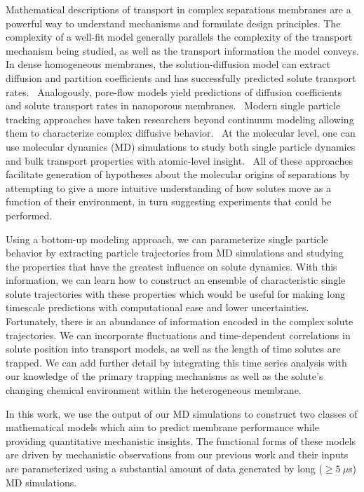 \documentclass[aps,pre,preprint,groupedaddress,longbibliography]{revtex4-2}
\begin{document}
  Mathematical descriptions of transport in complex separations membranes are a
  powerful way to understand mechanisms and formulate design principles.
  \cite{vinh-thang_predictive_2013,geens_transport_2006,darvishmanesh_mass_2016}
  The complexity of a well-fit model generally parallels the complexity of the
  transport mechanism being studied, as well as the transport information the
  model conveys. In dense homogeneous membranes, the solution-diffusion model
  can extract diffusion and partition coefficients and has successfully
  predicted solute transport rates.~\cite{wijmans_solution-diffusion_1995}
  Analogously, pore-flow models yield predictions of diffusion coefficients and
  solute transport rates in nanoporous membranes.~\cite{paul_diffusive_1974}
  Modern single particle tracking approaches have taken researchers beyond
  continuum modeling allowing them to characterize complex diffusive
  behavior.~\cite{manzo_review_2015} At the molecular level, one can use
  molecular dynamics (MD) simulations to study both single particle dynamics
  and bulk transport properties with atomic-level
  insight.~\cite{coscia_chemically_2019,maginn_best_2018} All of these
  approaches facilitate generation of hypotheses about the molecular origins of
  separations by attempting to give a more intuitive understanding of how
  solutes move as a function of their environment, in turn suggesting
  experiments that could be performed.

  Using a bottom-up modeling approach, we can parameterize single particle
  behavior by extracting particle trajectories from MD simulations and studying
  the properties that have the greatest influence on solute dynamics. With this
  information, we can learn how to construct an ensemble of characteristic
  single solute trajectories with these properties which would be useful for
  making long timescale predictions with computational ease and lower
  uncertainties. Fortunately, there is an abundance of information encoded in
  the complex solute trajectories. We can incorporate fluctuations and 
  time-dependent correlations in solute position into transport models, 
  as well as the length of time solutes are trapped. We can add further detail by integrating
  this time series analysis with our knowledge of the primary trapping
  mechanisms as well as the solute's changing chemical environment within the
  heterogeneous membrane. 

  In this work, we use the output of our MD simulations to construct two
  classes of mathematical models which aim to predict membrane performance
  while providing quantitative mechanistic insights. The functional forms of
  these models are driven by mechanistic observations from our previous work and
  their inputs are parameterized using a substantial amount of data generated
  by long ($\geq 5~\mu$s) MD simulations. 
  
\end{document}
